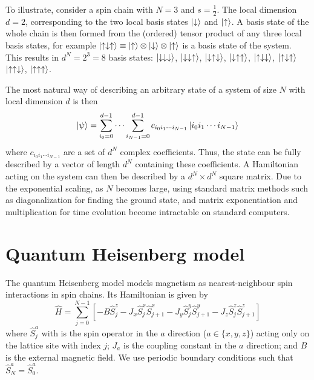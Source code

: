 \documentclass[a4paper, headsepline, footheight=13.6pt]{scrartcl}
\begin{document}
To illustrate, consider a spin chain with $N=3$ and $s=\frac12$. The local dimension $d=2$, corresponding to the two local basis states $\ket{\downarrow}$ and $\ket{\uparrow}$. A basis state of the whole chain is then formed from the (ordered) tensor product of any three local basis states, for example $\ket{\uparrow\downarrow\uparrow} \equiv \ket{\uparrow} \otimes \ket{\downarrow} \otimes \ket{\uparrow}$ is a basis state of the system. This results in $d^N=2^3=8$ basis states: {$\ket{\downarrow\downarrow\downarrow}$, $\ket{\downarrow\downarrow\uparrow}$, $\ket{\downarrow\uparrow\downarrow}$, $\ket{\downarrow\uparrow\uparrow}$, $\ket{\uparrow\downarrow\downarrow}$, $\ket{\uparrow\downarrow\uparrow}$ $\ket{\uparrow\uparrow\downarrow}$, $\ket{\uparrow\uparrow\uparrow}$}.

The most natural way of describing an arbitrary state of a system of size $N$ with local dimension $d$ is then
\begin{equation} \label{eq:basis_state_sum}
    \ket{\psi} = \sum_{i_0=0}^{d-1} \cdots \sum_{i_{N-1}=0}^{d-1} c_{i_0 i_1 \cdots i_{N-1}} \ket{i_0 i_1 \cdots i_{N-1}}
\end{equation}
where $c_{i_0 i_1 \cdots i_{N-1}}$ are a set of $d^N$ complex coefficients. Thus, the state can be fully described by a vector of length $d^N$ containing these coefficients. A Hamiltonian acting on the system can then be described by a {$d^N \times d^N$} square matrix. Due to the exponential scaling, as $N$ becomes large, using standard matrix methods such as diagonalization for finding the ground state, and matrix exponentiation and multiplication for time evolution become intractable on standard computers.

\section{Quantum Heisenberg model} \label{sec:quantum_heisenberg}
The quantum Heisenberg model \cite{Heisenberg:1928aa} models magnetism as nearest-neighbour spin interactions in spin chains. Its Hamiltonian is given by
\begin{equation} \label{eq:heisenberg_hamiltonian}
    \hat{H} = \sum_{j=0}^{N-1}\left[-B\hat{S}^z_{j} - J_x \hat{S}^x_{j}\hat{S}^x_{j+1} - J_y \hat{S}^y_{j}\hat{S}^y_{j+1} - J_z \hat{S}^z_{j}\hat{S}^z_{j+1} \right]
\end{equation}
where $\hat{S}^a_j$ with is the spin operator in the $a$ direction ($a \in \{x, y, z\}$) acting only on the lattice site with index $j$; $J_a$ is the coupling constant in the $a$ direction; and $B$ is the external magnetic field. We use periodic boundary conditions such that $\hat{S}^a_{N} = \hat{S}^a_{0}$.
\end{document}
